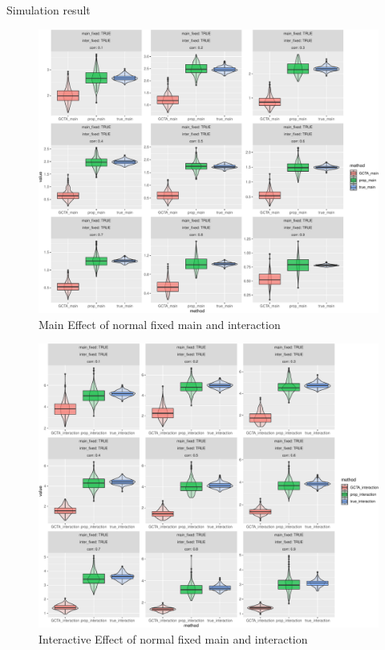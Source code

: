 \documentclass[]{article}
\begin{document}
Simulation result

\begin{figure}
\centering
\includegraphics{Simulation_report_files/figure-latex/main_fixed_fixed_normal-1.pdf}
\caption{Main Effect of normal fixed main and interaction}
\end{figure}

\begin{figure}
\centering
\includegraphics{Simulation_report_files/figure-latex/inter_fixed_fixed_normal-1.pdf}
\caption{Interactive Effect of normal fixed main and interaction}
\end{figure}
\end{document}
